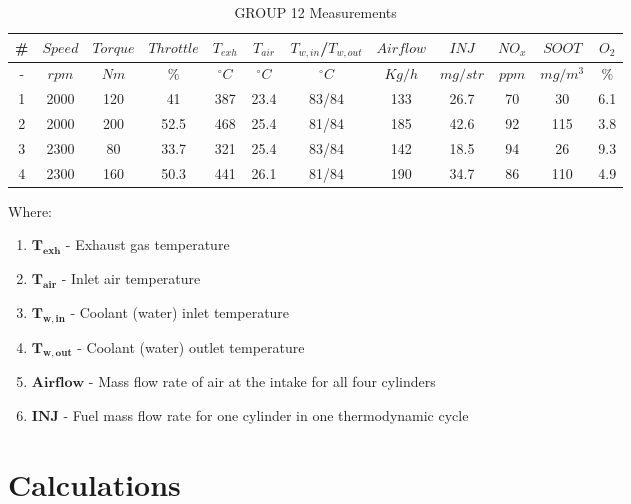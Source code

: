 \documentclass{report}
\begin{document}
\begin{table}[h]
    \centering
    \renewcommand{\arraystretch}{1.2}    
    \begin{tabular}{|c|c|c|c|c|c|c|c|c|c|c|c|}
    \hline
    \rowcolor{blue}
    \# & $Speed$ & $Torque$ & $Throttle$ & $T_{exh}$ & $T_{air}$ & $T_{w,in}$/$T_{w,out}$ & $Airflow$ & $INJ$ & $NO_x$ & $SOOT$ & $O_2$ \\
    \hline
    \rowcolor{gray}
    - & $rpm$ & $Nm$ & \% & $^\circ C$ & $^\circ C$ & $^\circ C$ & $Kg/h$ & $mg/str$ & $ppm$ & $mg/m^3$ & \% \\
    \hline
    1 & 2000 & 120 & 41 & 387 & 23.4 & 83/84 & 133 & 26.7 & 70 & 30 & 6.1 \\
    \hline
    2 & 2000 & 200 & 52.5 & 468 & 25.4 & 81/84 & 185 & 42.6 & 92 & 115 & 3.8 \\
    \hline
    3 & 2300 & 80 & 33.7 & 321 & 25.4 & 83/84 & 142 & 18.5 & 94 & 26 & 9.3 \\
    \hline
    4 & 2300 & 160 & 50.3 & 441 & 26.1 & 81/84 & 190 & 34.7 & 86 & 110 & 4.9 \\
    \hline
    \end{tabular}
    \caption{%
    GROUP 12 Measurements}
    \label{tab:metrhseis}
\end{table}

Where:
\begin{enumerate}
    \item $\boldsymbol{T_{exh}}$ - Exhaust gas temperature
    \item $\boldsymbol{T_{air}}$ - Inlet air temperature
    \item $\boldsymbol{T_{w,in}}$ - Coolant (water) inlet temperature
    \item $\boldsymbol{T_{w,out}}$ - Coolant (water) outlet temperature
    \item $\boldsymbol{Airflow}$ - Mass flow rate of air at the intake for all four cylinders
    \item $\boldsymbol{INJ}$ - Fuel mass flow rate for one cylinder in one thermodynamic cycle
\end{enumerate}







\chapter{%
Calculations}
\end{document}

